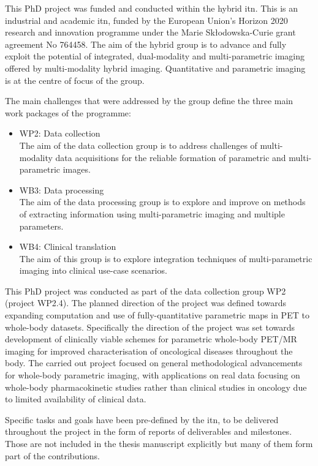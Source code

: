 This PhD project was funded and conducted within the \Gls{hybrid} \gls{itn}. This is an industrial and academic \gls{itn}, funded by the European Union's Horizon 2020 research and innovation programme under the Marie Sk\l{}odowska-Curie grant agreement No 764458.
The aim of the \gls{hybrid} group is to advance and fully exploit the potential of integrated, dual-modality and multi-parametric imaging offered by multi-modality hybrid imaging. Quantitative and parametric imaging is at the centre of focus of the group. 

The main challenges that were addressed by the group define the three main work packages of the programme:
\begin{itemize}
    \item WP2: Data collection \\
    The aim of the data collection group is to address challenges of multi-modality data acquisitions for the reliable formation of parametric and multi-parametric images. 
    \item WB3: Data processing \\
    The aim of the data processing group is to explore and improve on methods of extracting information using multi-parametric imaging and multiple parameters. 
    \item WB4: Clinical translation \\
    The aim of this group is to explore integration techniques of multi-parametric imaging into clinical use-case scenarios. 
\end{itemize}

This PhD project was conducted as part of the data collection group WP2 (project WP2.4). The planned direction of the project was defined towards expanding computation and use of fully-quantitative parametric maps in PET to whole-body datasets. Specifically the direction of the project was set towards development of clinically viable schemes for parametric whole-body PET/MR imaging for improved characterisation of oncological diseases throughout the body. The carried out project focused on general methodological advancements for whole-body parametric imaging, with applications on real data focusing on whole-body pharmacokinetic studies rather than clinical studies in oncology due to limited availability of clinical data.

Specific tasks and goals have been pre-defined by the \gls{itn}, to be delivered throughout the project in the form of reports of deliverables and milestones. Those are not included in the thesis manuscript explicitly but many of them form part of the contributions. 

